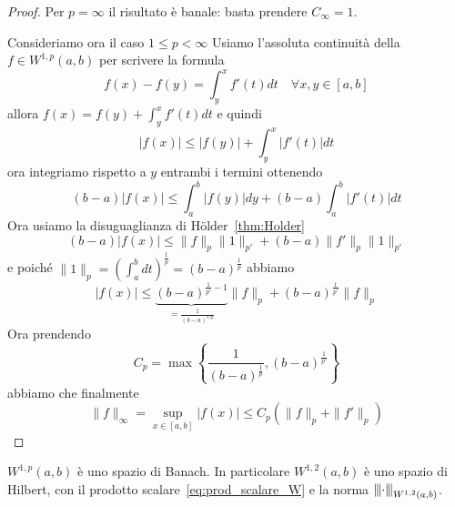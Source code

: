 \begin{proof}
    Per \(p = \infty\) il risultato è banale: basta prendere \(C_\infty = 1\).

    Consideriamo ora il caso \(1 \le p < \infty\) 
    Usiamo l'assoluta continuità della \(f \in W^{1,p}{(a,b)}\) per scrivere la
    formula
    \begin{equation}\label{help:fond_calcolo_xy}
    f{(x)} - f{(y)} = \int_{y} ^{x} f'{(t)}dt \quad \forall x, y \in [a,b]
    \end{equation}
    allora \(f{(x)} = f{(y)} + \int_y^{x}f'{(t)}dt\) e quindi
\[
    |f{(x)}| \le  |f{(y)}| +\int_y^{x} |f'{(t)}| dt
\]
    ora integriamo rispetto a \(y\) entrambi i termini ottenendo
\[
    {(b-a)}|f{(x)}| \le \int_a^{b} |f{(y)}|dy + (b-a)\int_a^{b} |f'{(t)}|dt
\]
    Ora usiamo la disuguaglianza di Hölder~\ref{thm:Holder}
\[
    {(b-a)}|f{(x)}| \le \|f\|_p \|1\|_{p'} + {(b-a)}\|f'\|_p \|1\|_{p'} 
\]
    e poiché \(\|1\|_p = {\left( \int_a^{b}dt \right)}^{\frac{1}{p}} =
    {(b-a)}^{\frac{1}{p}} \)  abbiamo
\[
    |f{(x)}| \le \underbrace{{(b-a)}^{\frac{1}{p'} - 1}}_{=
    \frac{1}{{(b-a)}^{1 / p}}}  \|f\|_p +
    {(b-a)}^{\frac{1}{p'}} \|f\|_p
\]
    Ora prendendo
\[
    C_p = \max \left\{ \frac{1}{{(b-a)}^{\frac{1}{p}}}, {(b-a)}^{\frac{1}{p'}}\right\} 
\]
    abbiamo che finalmente
\[
    \|f\|_\infty = \sup_{x \in [a,b]} |f{(x)}| \le C_p {\left( \|f\|_p + \|f'\|_p \right)} 
\]
\end{proof}
\begin{theorem}[Completezza di \(W^{1,p}(a,b)\)]\label{th:w1p-banach}
    \(W^{1,p}{(a,b)}\) è uno spazio di Banach. In particolare \(W^{1,2}{(a,b)}\)
    è uno spazio di Hilbert, con il prodotto scalare~\eqref{eq:prod_scalare_W} e
    la norma \hyperlink{3norm}{\(\left\lvert\hspace{-1 pt}\left\lvert\hspace{-1 pt}\left\lvert\cdot \right\lvert\hspace{-1 pt}\right\lvert\hspace{-1 pt}\right\lvert_{W^{1,2}{(a,b)}}\)}.
\end{theorem}
